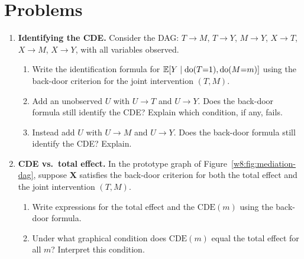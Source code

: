 \documentclass[master.tex]{subfiles}
\begin{document}
\newpage
\section*{Problems}

\begin{enumerate}[label=\textbf{\arabic*.}, leftmargin=*, itemsep=10pt]

  \item \textbf{Identifying the CDE.}
  Consider the DAG: $T \to M$, $T \to Y$, $M \to Y$, $X \to T$,
  $X \to M$, $X \to Y$, with all variables observed.
  \begin{enumerate}[label=(\alph*)]
    \item Write the identification formula for
      $\mathbb{E}[Y \mid \mathrm{do}(T{=}1), \mathrm{do}(M{=}m)]$ using the back-door
      criterion for the joint intervention $(T, M)$.
    \item Add an unobserved $U$ with $U \to T$ and $U \to Y$.  Does the
      back-door formula still identify the CDE?  Explain which
      condition, if any, fails.
    \item Instead add $U$ with $U \to M$ and $U \to Y$.  Does the
      back-door formula still identify the CDE?  Explain.
  \end{enumerate}

  \item \textbf{CDE vs.\ total effect.}
  In the prototype graph of Figure~\ref{w8:fig:mediation-dag}, suppose
  $\mathbf{X}$ satisfies the back-door criterion for both the total
  effect and the joint intervention $(T, M)$.
  \begin{enumerate}[label=(\alph*)]
    \item Write expressions for the total effect and the $\mathrm{CDE}(m)$
      using the back-door formula.
    \item Under what graphical condition does $\mathrm{CDE}(m)$ equal the
      total effect for all $m$?  Interpret this condition.
  \end{enumerate}


\end{enumerate}
\end{document}
